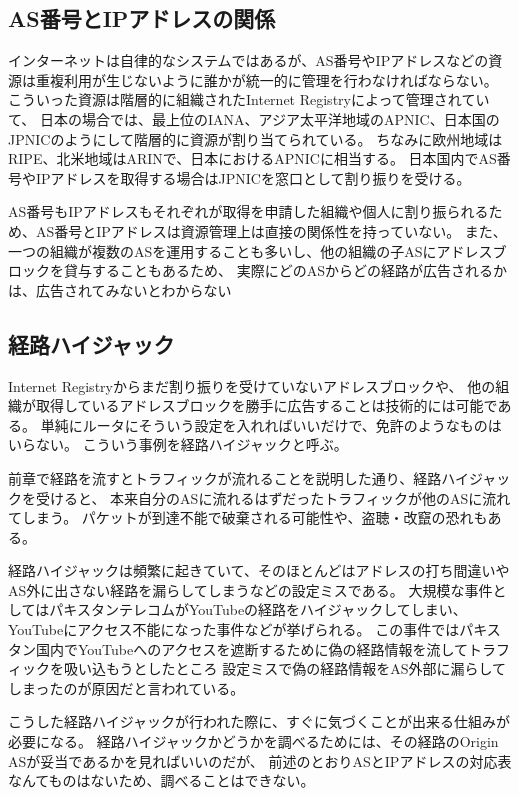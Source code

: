 \subsection{AS番号とIPアドレスの関係}

インターネットは自律的なシステムではあるが、AS番号やIPアドレスなどの資源は重複利用が生じないように誰かが統一的に管理を行わなければならない。
こういった資源は階層的に組織されたInternet Registryによって管理されていて、
日本の場合では、最上位のIANA、アジア太平洋地域のAPNIC、日本国のJPNICのようにして階層的に資源が割り当てられている。
ちなみに欧州地域はRIPE、北米地域はARINで、日本におけるAPNICに相当する。
日本国内でAS番号やIPアドレスを取得する場合はJPNICを窓口として割り振りを受ける。

AS番号もIPアドレスもそれぞれが取得を申請した組織や個人に割り振られるため、AS番号とIPアドレスは資源管理上は直接の関係性を持っていない。
また、一つの組織が複数のASを運用することも多いし、他の組織の子ASにアドレスブロックを貸与することもあるため、
実際にどのASからどの経路が広告されるかは、広告されてみないとわからない

\subsection{経路ハイジャック}

Internet Registryからまだ割り振りを受けていないアドレスブロックや、
他の組織が取得しているアドレスブロックを勝手に広告することは技術的には可能である。
単純にルータにそういう設定を入れればいいだけで、免許のようなものはいらない。
こういう事例を経路ハイジャックと呼ぶ。

前章で経路を流すとトラフィックが流れることを説明した通り、経路ハイジャックを受けると、
本来自分のASに流れるはずだったトラフィックが他のASに流れてしまう。
パケットが到達不能で破棄される可能性や、盗聴・改竄の恐れもある。

経路ハイジャックは頻繁に起きていて、そのほとんどはアドレスの打ち間違いやAS外に出さない経路を漏らしてしまうなどの設定ミスである。
大規模な事件としてはパキスタンテレコムがYouTubeの経路をハイジャックしてしまい、YouTubeにアクセス不能になった事件などが挙げられる。
この事件ではパキスタン国内でYouTubeへのアクセスを遮断するために偽の経路情報を流してトラフィックを吸い込もうとしたところ
設定ミスで偽の経路情報をAS外部に漏らしてしまったのが原因だと言われている。

こうした経路ハイジャックが行われた際に、すぐに気づくことが出来る仕組みが必要になる。
経路ハイジャックかどうかを調べるためには、その経路のOrigin ASが妥当であるかを見ればいいのだが、
前述のとおりASとIPアドレスの対応表なんてものはないため、調べることはできない。

